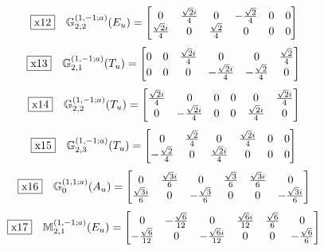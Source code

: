 \documentclass[fleqn,10pt,landscape]{jsarticle}
\begin{document}
\begin{dmath*}
\fbox{x12}\quad \mathbb{G}_{2,2}^{(1,-1;a)}(E_{u})=\begin{bmatrix} 0 & \frac{\sqrt{2} i}{4} & 0 & - \frac{\sqrt{2}}{4} & 0 & 0 \\ \frac{\sqrt{2} i}{4} & 0 & \frac{\sqrt{2}}{4} & 0 & 0 & 0 \end{bmatrix}
\end{dmath*}
\begin{dmath*}
\fbox{x13}\quad \mathbb{G}_{2,1}^{(1,-1;a)}(T_{u})=\begin{bmatrix} 0 & 0 & \frac{\sqrt{2} i}{4} & 0 & 0 & \frac{\sqrt{2}}{4} \\ 0 & 0 & 0 & - \frac{\sqrt{2} i}{4} & - \frac{\sqrt{2}}{4} & 0 \end{bmatrix}
\end{dmath*}
\begin{dmath*}
\fbox{x14}\quad \mathbb{G}_{2,2}^{(1,-1;a)}(T_{u})=\begin{bmatrix} \frac{\sqrt{2} i}{4} & 0 & 0 & 0 & 0 & \frac{\sqrt{2} i}{4} \\ 0 & - \frac{\sqrt{2} i}{4} & 0 & 0 & \frac{\sqrt{2} i}{4} & 0 \end{bmatrix}
\end{dmath*}
\begin{dmath*}
\fbox{x15}\quad \mathbb{G}_{2,3}^{(1,-1;a)}(T_{u})=\begin{bmatrix} 0 & \frac{\sqrt{2}}{4} & 0 & \frac{\sqrt{2} i}{4} & 0 & 0 \\ - \frac{\sqrt{2}}{4} & 0 & \frac{\sqrt{2} i}{4} & 0 & 0 & 0 \end{bmatrix}
\end{dmath*}
\begin{dmath*}
\fbox{x16}\quad \mathbb{G}_{0}^{(1,1;a)}(A_{u})=\begin{bmatrix} 0 & \frac{\sqrt{3} i}{6} & 0 & \frac{\sqrt{3}}{6} & \frac{\sqrt{3} i}{6} & 0 \\ \frac{\sqrt{3} i}{6} & 0 & - \frac{\sqrt{3}}{6} & 0 & 0 & - \frac{\sqrt{3} i}{6} \end{bmatrix}
\end{dmath*}
\begin{dmath*}
\fbox{x17}\quad \mathbb{M}_{2,1}^{(1,-1;a)}(E_{u})=\begin{bmatrix} 0 & - \frac{\sqrt{6}}{12} & 0 & \frac{\sqrt{6} i}{12} & \frac{\sqrt{6}}{6} & 0 \\ - \frac{\sqrt{6}}{12} & 0 & - \frac{\sqrt{6} i}{12} & 0 & 0 & - \frac{\sqrt{6}}{6} \end{bmatrix}
\end{dmath*}
\end{document}
